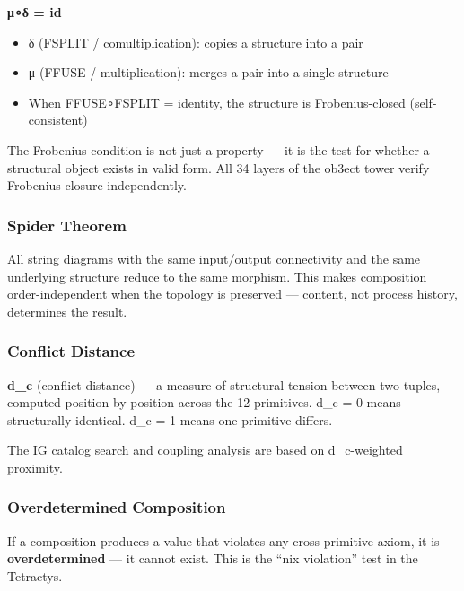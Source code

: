 \documentclass[12pt,a4paper]{article}
\begin{document}
\textbf{μ∘δ = id}

\begin{itemize}
\tightlist
\item
  δ (FSPLIT / comultiplication): copies a structure into a pair
\item
  μ (FFUSE / multiplication): merges a pair into a single structure
\item
  When FFUSE∘FSPLIT = identity, the structure is Frobenius-closed
  (self-consistent)
\end{itemize}

The Frobenius condition is not just a property --- it is the test for
whether a structural object exists in valid form. All 34 layers of the
ob3ect tower verify Frobenius closure independently.

\hypertarget{spider-theorem}{%
\subsubsection{Spider Theorem}\label{spider-theorem}}

All string diagrams with the same input/output connectivity and the same
underlying structure reduce to the same morphism. This makes composition
order-independent when the topology is preserved --- content,
not process history, determines the result.

\hypertarget{conflict-distance}{%
\subsubsection{Conflict Distance}\label{conflict-distance}}

\textbf{d\_c} (conflict distance) --- a measure of structural tension
between two tuples, computed position-by-position across the 12
primitives. d\_c = 0 means structurally identical. d\_c = 1 means one
primitive differs.

The IG catalog search and coupling analysis are based on d\_c-weighted
proximity.

\hypertarget{overdetermined-composition}{%
\subsubsection{Overdetermined
Composition}\label{overdetermined-composition}}

If a composition produces a value that violates any cross-primitive
axiom, it is \textbf{overdetermined} --- it cannot exist. This is the
``nix violation'' test in the Tetractys.
\end{document}
